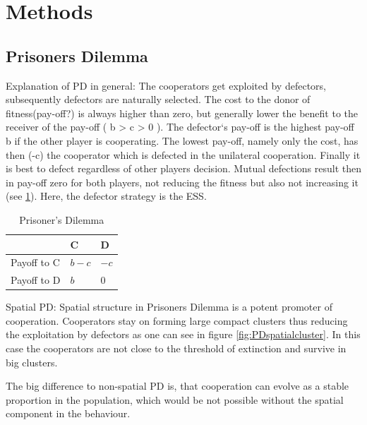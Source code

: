 \documentclass[DIV=calc, paper=a4, fontsize=11pt, twocolumn]{scrartcl}	 %
\begin{document}
\section{Methods}



\subsection*{Prisoners Dilemma}

Explanation of PD in general:
The cooperators get exploited by defectors, subsequently defectors are naturally selected. The cost to the donor of fitness(pay-off?) is always higher than zero, but generally lower the benefit to the receiver of the pay-off ( b > c > 0 ). The defector‘s pay-off is the highest pay-off b if the other player is cooperating. The lowest pay-off, namely only the cost, has then (-c) the cooperator which is defected in the unilateral cooperation. Finally it is best to defect regardless of other players decision. Mutual defections result then in pay-off zero for both players, not reducing the fitness but also not increasing it (see \ref{table1}). Here, the defector strategy is the ESS. 

\begin{table}[h]
\caption{Prisoner's Dilemma}
\label{table1}
\centering
\begin{tabular}{lll}
 & C & D \\
\midrule
Payoff to C & $b-c$ & $-c$ \\
Payoff to D & $b$ & $0$ \\
\bottomrule
\end{tabular}
\end{table}

Spatial PD: 
Spatial structure in Prisoners Dilemma is a potent promoter of cooperation. Cooperators stay on forming large compact clusters thus reducing the exploitation by defectors as one can see in figure \ref{fig:PDspatialcluster}. In this case the cooperators are not close to the threshold of extinction and survive in big clusters. 

The big difference to non-spatial PD is, that cooperation can evolve as a stable proportion in the population, which would be not possible without the spatial component in the behaviour. 
\end{document}
